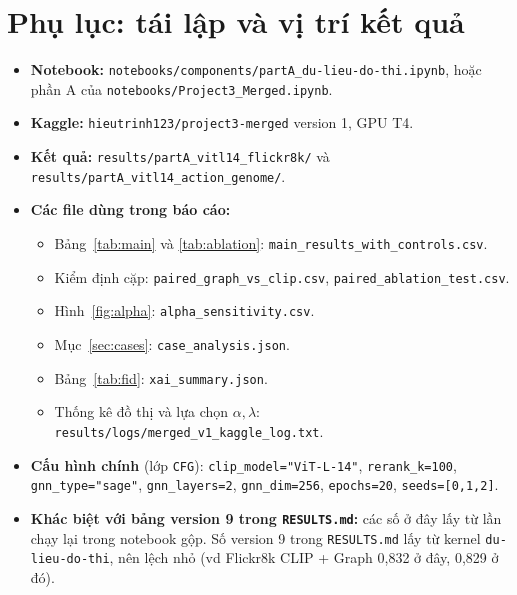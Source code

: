 \documentclass[11pt,a4paper]{article}
\begin{document}
\section*{Phụ lục: tái lập và vị trí kết quả}
\begin{itemize}
  \item \textbf{Notebook:} \texttt{notebooks/components/partA\_du-lieu-do-thi.ipynb}, hoặc phần A của \texttt{notebooks/Project3\_Merged.ipynb}.
  \item \textbf{Kaggle:} \texttt{hieutrinh123/project3-merged} version 1, GPU T4.
  \item \textbf{Kết quả:} \texttt{results/partA\_vitl14\_flickr8k/} và \texttt{results/partA\_vitl14\_action\_genome/}.
  \item \textbf{Các file dùng trong báo cáo:}
  \begin{itemize}
    \item Bảng~\ref{tab:main} và \ref{tab:ablation}: \texttt{main\_results\_with\_controls.csv}.
    \item Kiểm định cặp: \texttt{paired\_graph\_vs\_clip.csv}, \texttt{paired\_ablation\_test.csv}.
    \item Hình~\ref{fig:alpha}: \texttt{alpha\_sensitivity.csv}.
    \item Mục~\ref{sec:cases}: \texttt{case\_analysis.json}.
    \item Bảng~\ref{tab:fid}: \texttt{xai\_summary.json}.
    \item Thống kê đồ thị và lựa chọn \(\alpha,\lambda\): \texttt{results/logs/merged\_v1\_kaggle\_log.txt}.
  \end{itemize}
  \item \textbf{Cấu hình chính} (lớp \texttt{CFG}): \texttt{clip\_model="ViT-L-14"}, \texttt{rerank\_k=100}, \texttt{gnn\_type="sage"}, \texttt{gnn\_layers=2}, \texttt{gnn\_dim=256}, \texttt{epochs=20}, \texttt{seeds=[0,1,2]}.
  \item \textbf{Khác biệt với bảng version 9 trong \texttt{RESULTS.md}:} các số ở đây lấy từ lần chạy lại trong notebook gộp. Số version 9 trong \texttt{RESULTS.md} lấy từ kernel \texttt{du-lieu-do-thi}, nên lệch nhỏ (vd Flickr8k CLIP + Graph 0,832 ở đây, 0,829 ở đó).
\end{itemize}
\end{document}
